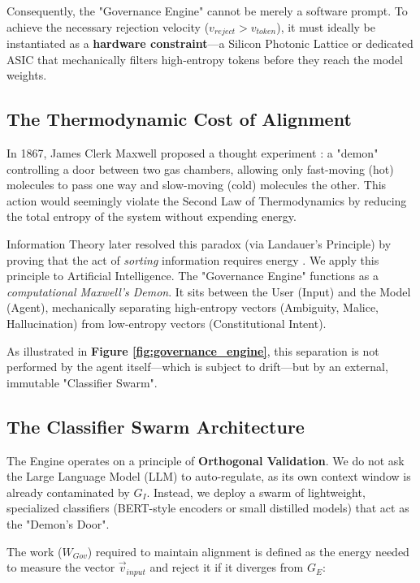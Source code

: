 \documentclass[11pt, a4paper]{article}
\newcommand{\Ge}{G_E}
\newcommand{\Gi}{G_I}
\newcommand{\Wgov}{W_{Gov}}
\begin{document}
Consequently, the "Governance Engine" cannot be merely a software prompt. To achieve the necessary rejection velocity ($v_{reject} > v_{token}$), it must ideally be instantiated as a \textbf{hardware constraint}---a Silicon Photonic Lattice or dedicated ASIC that mechanically filters high-entropy tokens before they reach the model weights.

\subsection{The Thermodynamic Cost of Alignment}

In 1867, James Clerk Maxwell proposed a thought experiment \cite{maxwell1871}: a "demon" controlling a door between two gas chambers, allowing only fast-moving (hot) molecules to pass one way and slow-moving (cold) molecules the other. This action would seemingly violate the Second Law of Thermodynamics by reducing the total entropy of the system without expending energy.

Information Theory later resolved this paradox (via Landauer's Principle) by proving that the act of \textit{sorting} information requires energy \cite{landauer1961}. We apply this principle to Artificial Intelligence. The "Governance Engine" functions as a \textit{computational Maxwell's Demon}. It sits between the User (Input) and the Model (Agent), mechanically separating high-entropy vectors (Ambiguity, Malice, Hallucination) from low-entropy vectors (Constitutional Intent).

As illustrated in \textbf{Figure \ref{fig:governance_engine}}, this separation is not performed by the agent itself---which is subject to drift---but by an external, immutable "Classifier Swarm".

\subsection{The Classifier Swarm Architecture}

The Engine operates on a principle of \textbf{Orthogonal Validation}. We do not ask the Large Language Model (LLM) to auto-regulate, as its own context window is already contaminated by $\Gi$. Instead, we deploy a swarm of lightweight, specialized classifiers (BERT-style encoders or small distilled models) that act as the "Demon's Door".

The work ($\Wgov$) required to maintain alignment is defined as the energy needed to measure the vector $\vec{v}_{input}$ and reject it if it diverges from $\Ge$:
\end{document}
